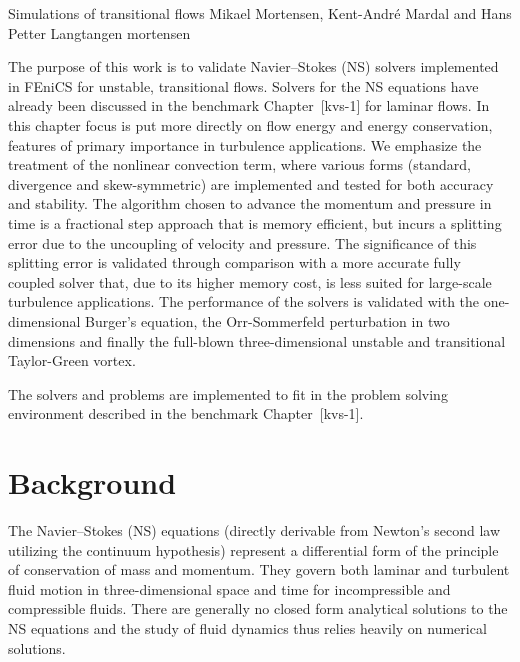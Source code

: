 
\renewcommand{\vec}[1]{\ensuremath{{ #1 \xspace}}}
\newcommand{\Nset}{\ensuremath{\mathbb{N}}\xspace}
\newcommand{\Zset}{\ensuremath{\mathbb{Z}}\xspace}
\newcommand{\Qset}{\ensuremath{\mathbb{Q}}\xspace}
\newcommand{\Cset}{\ensuremath{\mathbb{C}}\xspace}
\newcommand{\Hset}{\ensuremath{\mathbb{H}}\xspace}


              {Simulations of transitional flows}
              {Mikael Mortensen, Kent-Andr\'{e} Mardal and Hans Petter Langtangen}
              {mortensen}

The purpose of this work is to validate Navier--Stokes (NS) solvers implemented in FEniCS for unstable, transitional flows. Solvers for the NS equations have already been discussed in the benchmark Chapter~[kvs-1] for laminar flows. In this chapter focus is put more directly on flow energy and energy conservation, features of primary importance in turbulence applications. We emphasize the treatment of the nonlinear convection term, where various forms (standard, divergence and skew-symmetric) are implemented and tested for both accuracy and stability. The algorithm chosen to advance the momentum and pressure in time is a fractional step approach that is memory efficient, but incurs a splitting error due to the uncoupling of velocity and pressure. The significance of this splitting error is validated through comparison with a more accurate fully coupled solver that, due to its higher memory cost, is less suited for large-scale turbulence applications. The performance of the solvers is validated with the one-dimensional Burger's equation, the Orr-Sommerfeld perturbation in two dimensions and finally the full-blown three-dimensional unstable and transitional Taylor-Green vortex.

The solvers and problems are implemented to fit in the problem solving environment described in the benchmark Chapter~[kvs-1].

\section{Background}

The Navier--Stokes (NS) equations (directly derivable from Newton's second law utilizing the continuum hypothesis) represent a differential form of the principle of conservation of mass and momentum. They govern both laminar and turbulent fluid motion in three-dimensional space and time for incompressible and compressible fluids. There are generally no closed form analytical solutions to the NS equations and the study of fluid dynamics thus relies heavily on numerical solutions.

